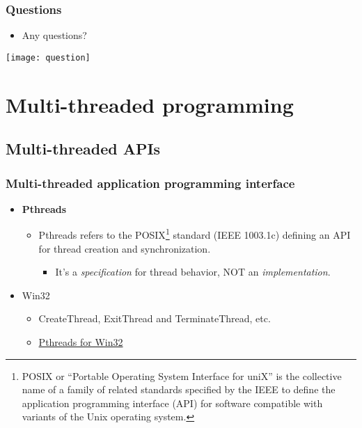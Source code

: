 \documentclass[CJKutf8,dvipsnames,table]{beamer}
\begin{document}
\begin{CJK*}{UTF8}{song}
  \fi

  \begin{frame}
  \frametitle{Questions}
  \begin{itemize}
  \item Any questions? 
  \end{itemize}
  \begin{center}
    \texttt{[image: question]}
  \end{center}
  \end{frame}

  \fi

  \section{Multi-threaded programming}

\iffalse

  \begin{frame}
  \frametitle{Multi-threaded programming} \pause
  \begin{itemize}
  \item Application programming interfaces (APIs)  \pause
  \item Writing multi-threaded code 
  \end{itemize}
  \end{frame}

\fi

  \subsection{Multi-threaded APIs}

  \begin{frame}
  \frametitle{Multi-threaded application programming interface} \pause
  \begin{itemize}
  \item \textbf{Pthreads}  \pause
    \begin{itemize}
    \item Pthreads refers to the POSIX\footnote{POSIX or ``Portable Operating System Interface for uniX'' is the collective name of a family of related standards specified by the IEEE to define the application programming interface (API) for software compatible with variants of the Unix operating system.} standard (IEEE 1003.1c) defining an API for thread creation and synchronization.  \pause
      \begin{itemize}
      \item It's a \emph{specification} for thread behavior, NOT an \emph{implementation}.  \pause
      \end{itemize}
    \end{itemize}
  \item Win32  \pause
    \begin{itemize}
    \item CreateThread, ExitThread and TerminateThread, etc.  \pause
    \item \href{http://sources.redhat.com/pthreads-win32}{Pthreads for Win32} 
    \end{itemize}
  \end{itemize}
  \end{frame}


\end{CJK*}
\end{document}

